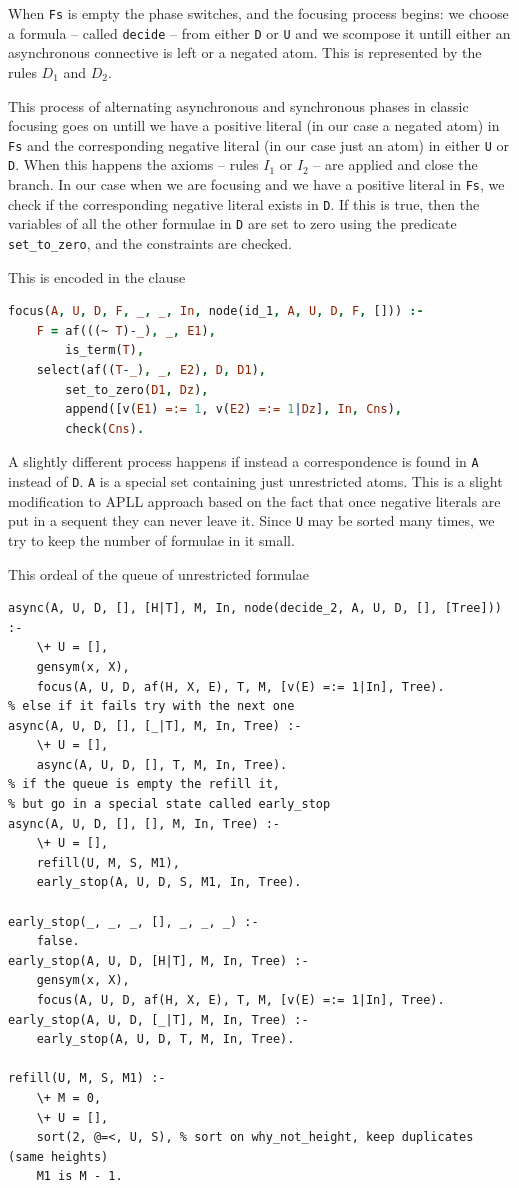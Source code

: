 \documentclass[a4paper, 12pt, tesi, english]{report}
\begin{document}
When \texttt{Fs} is empty the phase switches, and the focusing process begins: we choose a formula -- called \texttt{decide} -- from either \texttt{D} or \texttt{U} and we scompose it untill either an asynchronous connective is left or a negated atom.
This is represented by the rules $D_1$ and $D_2$.

This process of alternating asynchronous and synchronous phases in classic focusing goes on untill we have a positive literal (in our case a negated atom) in \texttt{Fs} and the corresponding negative literal (in our case just an atom) in either \texttt{U} or \texttt{D}.
When this happens the axioms -- rules $I_1$ or $I_2$ -- are applied and close the branch.
In our case when we are focusing and we have a positive literal in \texttt{Fs}, we check if the corresponding negative literal exists in \texttt{D}.
If this is true, then the variables of all the other formulae in \texttt{D} are set to zero using the predicate \texttt{set\_to\_zero}, and the constraints are checked.

This is encoded in the clause 
\begin{lstlisting}[language=prolog]
focus(A, U, D, F, _, _, In, node(id_1, A, U, D, F, [])) :-
	F = af(((~ T)-_), _, E1),
    	is_term(T),
	select(af((T-_), _, E2), D, D1),
    	set_to_zero(D1, Dz),
    	append([v(E1) =:= 1, v(E2) =:= 1|Dz], In, Cns),
    	check(Cns).
\end{lstlisting}
A slightly different process happens if instead a correspondence is found in \texttt{A} instead of \texttt{D}.
\texttt{A} is a special set containing just unrestricted atoms.
This is a slight modification to APLL approach based on the fact that once negative literals are put in a sequent they can never leave it.
Since \texttt{U} may be sorted many times, we try to keep the number of formulae in it small.

This ordeal of the queue of unrestricted formulae 

\begin{lstlisting}
async(A, U, D, [], [H|T], M, In, node(decide_2, A, U, D, [], [Tree])) :-
	\+ U = [],
	gensym(x, X),
	focus(A, U, D, af(H, X, E), T, M, [v(E) =:= 1|In], Tree).
% else if it fails try with the next one
async(A, U, D, [], [_|T], M, In, Tree) :-
	\+ U = [],
	async(A, U, D, [], T, M, In, Tree).
% if the queue is empty the refill it, 
% but go in a special state called early_stop
async(A, U, D, [], [], M, In, Tree) :-
	\+ U = [],
	refill(U, M, S, M1),
	early_stop(A, U, D, S, M1, In, Tree).

early_stop(_, _, _, [], _, _, _) :-
	false.
early_stop(A, U, D, [H|T], M, In, Tree) :-
	gensym(x, X),
	focus(A, U, D, af(H, X, E), T, M, [v(E) =:= 1|In], Tree).
early_stop(A, U, D, [_|T], M, In, Tree) :-
	early_stop(A, U, D, T, M, In, Tree).

refill(U, M, S, M1) :-
	\+ M = 0,
	\+ U = [], 
	sort(2, @=<, U, S), % sort on why_not_height, keep duplicates (same heights)
	M1 is M - 1.
\end{lstlisting}
\end{document}
